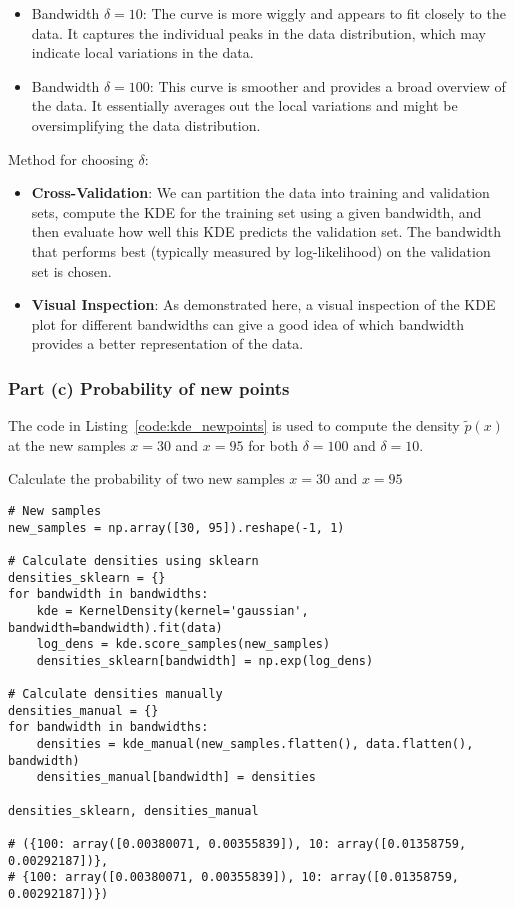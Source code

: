 \documentclass{article}
\begin{document}
\begin{itemize}
    \item Bandwidth $\delta = 10$: The curve is more wiggly and appears to fit closely to the data. It captures the individual peaks in the data distribution, which may indicate local variations in the data.
    \item Bandwidth $\delta = 100$: This curve is smoother and provides a broad overview of the data. It essentially averages out the local variations and might be oversimplifying the data distribution.
\end{itemize}

Method for choosing $\delta$:

\begin{itemize}
    \item \textbf{Cross-Validation}: We can partition the data into training and validation sets, compute the KDE for the training set using a given bandwidth, and then evaluate how well this KDE predicts the validation set. The bandwidth that performs best (typically measured by log-likelihood) on the validation set is chosen.
    \item \textbf{Visual Inspection}: As demonstrated here, a visual inspection of the KDE plot for different bandwidths can give a good idea of which bandwidth provides a better representation of the data.
\end{itemize}

\subsubsection*{Part (c) Probability of new points}

The code in Listing~\ref{code:kde_newpoints} is used  to compute the density \( \tilde{p}(x) \) at the new samples \(x = 30\) and \(x = 95\) for both \( \delta = 100 \) and \( \delta = 10 \).

\begin{listing}[H]
\caption{Calculate the probability of two new samples \(x = 30\) and \(x = 95\)}
\label{code:kde_newpoints}
\begin{verbatim}
# New samples
new_samples = np.array([30, 95]).reshape(-1, 1)

# Calculate densities using sklearn
densities_sklearn = {}
for bandwidth in bandwidths:
    kde = KernelDensity(kernel='gaussian', bandwidth=bandwidth).fit(data)
    log_dens = kde.score_samples(new_samples)
    densities_sklearn[bandwidth] = np.exp(log_dens)

# Calculate densities manually
densities_manual = {}
for bandwidth in bandwidths:
    densities = kde_manual(new_samples.flatten(), data.flatten(), bandwidth)
    densities_manual[bandwidth] = densities

densities_sklearn, densities_manual

# ({100: array([0.00380071, 0.00355839]), 10: array([0.01358759, 0.00292187])},
# {100: array([0.00380071, 0.00355839]), 10: array([0.01358759, 0.00292187])})
\end{verbatim}
\end{listing}
\end{document}
